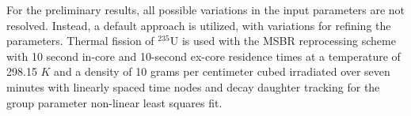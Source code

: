 For the preliminary results, all possible variations in the input parameters are not resolved.
Instead, a default approach is utilized, with variations for refining the parameters.
Thermal fission of $^{235}$U is used with the \gls{MSBR} reprocessing scheme with 10 second in-core and 10-second ex-core residence times at a temperature of 298.15 $K$ and a density of 10 grams per centimeter cubed irradiated over seven minutes with linearly spaced time nodes and decay daughter tracking for the group parameter non-linear least squares fit.
